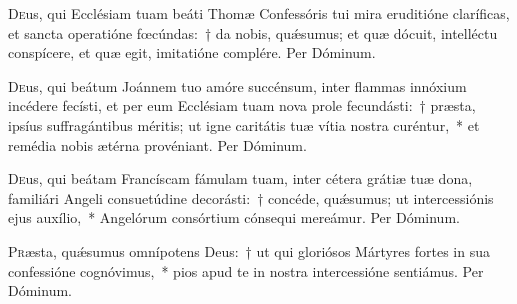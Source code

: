 \documentclass[vesperale_romanum.tex]{subfiles}
\begin{document}
\oratio

\lettrine{D}{e}us, qui Ecclésiam tuam beáti Thomæ Confessóris tui mira eruditióne claríficas, et san\-cta operatióne fœcúndas:~† da nobis, quǽsumus; et quæ dócuit, intellé\-ctu conspícere, et quæ egit, imitatióne complére. Per Dóminum.


\capitdeseqquad

\myrule


\duplex

\oratio

\lettrine{D}{e}us, qui beátum Joánnem tuo amóre succénsum, inter flammas innóxium incédere fecísti, et per eum Ecclésiam tuam nova prole fecundásti:~† præsta, i\-psíus suffragántibus méritis; ut igne caritátis tuæ vítia nostra curéntur,~* et remédia nobis ætérna provéniant. Per Dóminum.


\myrule

\newpage


\duplex

\oratio

\lettrine{D}{e}us, qui beátam Francíscam fámulam tuam, inter cétera grátiæ tuæ dona, familiári Angeli consuetúdine decorásti:~† concéde, quǽsumus; ut intercessiónis ejus auxílio,~* Angelórum consórtium cónsequi mereámur.
Per Dóminum.



\myrule


\semiduplex


\oratio

\lettrine{P}{r}æsta, quǽsumus omnípotens Deus:~† ut qui gloriósos Mártyres fortes in sua confessióne cognóvimus,~* pios apud te in nostra intercessióne sentiámus. Per Dóminum.
\end{document}
